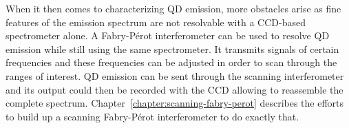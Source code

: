 When it then comes to characterizing \ac{QD} emission, more obstacles arise as fine features of the emission spectrum are not resolvable with a CCD-based spectrometer alone.
A Fabry-Pérot interferometer can be used to resolve \ac{QD} emission while still using the same spectrometer.
It transmits signals of certain frequencies and these frequencies can be adjusted in order to scan through the ranges of interest.
\ac{QD} emission can be sent through the scanning interferometer and its output could then be recorded with the CCD allowing to reassemble the complete spectrum.
Chapter~\ref{chapter:scanning-fabry-perot} describes the efforts to build up a scanning Fabry-Pérot interferometer to do exactly that.



